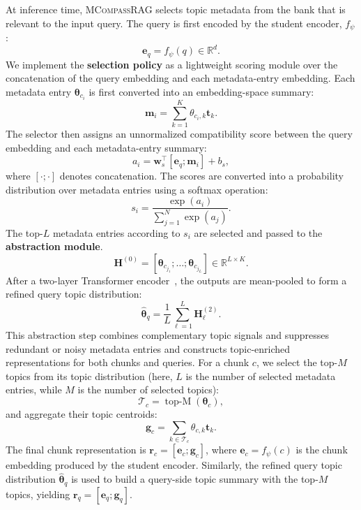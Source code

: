 \documentclass{llmxive}
\providecommand{\name}[1]{\textsc{MCompassRAG}\xspace}
\begin{document}
At inference time, \name{} selects topic metadata from the bank that is relevant to the input query. The query is first encoded by the student encoder, $f_{\psi}$:
\begin{equation}
    \mathbf{e}_q = f_{\psi}(q) \in \mathbb{R}^{d}.
\end{equation}
We implement the \textbf{selection policy} as a lightweight scoring module over the concatenation of the query embedding and each metadata-entry embedding. Each metadata entry $\boldsymbol{\theta}_{c_i}$ is first converted into an embedding-space summary:
\begin{equation}
    \mathbf{m}_i = \sum_{k=1}^{K} \theta_{c_i,k}\mathbf{t}_k .
\end{equation}
The selector then assigns an unnormalized compatibility score between the query embedding and each metadata-entry summary:
\begin{equation}
    a_i = \mathbf{w}_s^\top [\mathbf{e}_q ; \mathbf{m}_i] + b_s ,
\end{equation}
where $[\cdot;\cdot]$ denotes concatenation. The scores are converted into a probability distribution over metadata entries using a softmax operation:
\begin{equation}
    s_i =
    \frac{\exp(a_i)}
    {\sum_{j=1}^{N} \exp(a_j)} .
\end{equation}
The top-$L$ metadata entries according to $s_i$ are selected and passed to the \textbf{abstraction module}.
\begin{equation}
    \mathbf{H}^{(0)}
    =
    [\boldsymbol{\theta}_{c_{j_1}};\ldots;\boldsymbol{\theta}_{c_{j_L}}]
    \in \mathbb{R}^{L \times K}.
\end{equation}
After a two-layer Transformer encoder~\cite{NIPS2017_3f5ee243}, the outputs are mean-pooled to form a refined query topic distribution:
\begin{equation}
    \hat{\boldsymbol{\theta}}_q =
    \frac{1}{L}\sum_{\ell=1}^{L} \mathbf{H}^{(2)}_{\ell}.
\end{equation}
This abstraction step combines complementary topic signals and suppresses redundant or noisy metadata entries and constructs topic-enriched representations for both chunks and queries. For a chunk $c$, we select the top-$M$ topics from its topic distribution (here, $L$ is the number of selected metadata entries, while $M$ is the number of selected topics):
\begin{equation}
    \mathcal{T}_c = \operatorname{top\text{-}M}(\boldsymbol{\theta}_c),
\end{equation}
and aggregate their topic centroids:
\begin{equation}
    \mathbf{g}_c =
    \sum_{k \in \mathcal{T}_c}
    \theta_{c,k}\mathbf{t}_k .
\end{equation}
The final chunk representation is $\mathbf{r}_c = [\mathbf{e}_c ; \mathbf{g}_c]$, where $\mathbf{e}_c=f_{\psi}(c)$ is the chunk embedding produced by the student encoder. Similarly, the refined query topic distribution $\hat{\boldsymbol{\theta}}_q$ is used to build a query-side topic summary with the top-$M$ topics, yielding $\mathbf{r}_q = [\mathbf{e}_q ; \mathbf{g}_q]$.
\end{document}
